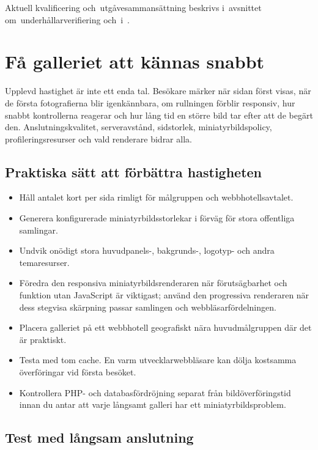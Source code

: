 \documentclass[11pt,a4paper]{article}
\newcommand{\filepath}[1]{\path{#1}}
\begin{document}
Aktuell kvalificering och~utgåvesammansättning beskrivs i~avsnittet
om~underhållarverifiering och~i~\filepath{RELEASE.md}.

\section{Få galleriet att kännas snabbt}
\label{sec:performance}

Upplevd hastighet är inte ett enda tal. Besökare märker när sidan först visas,
när de första fotografierna blir igenkännbara, om rullningen förblir responsiv,
hur snabbt kontrollerna reagerar och hur lång tid en större bild tar efter att
de begärt den. Anslutningskvalitet, serveravstånd, sidstorlek,
miniatyrbildspolicy, profileringsresurser och vald renderare bidrar alla.

\subsection{Praktiska sätt att förbättra hastigheten}

\begin{itemize}
  \item Håll antalet kort per sida rimligt för målgruppen och
  webbhotellsavtalet.
  \item Generera konfigurerade miniatyrbildsstorlekar i förväg för stora
  offentliga samlingar.
  \item Undvik onödigt stora huvudpanels-, bakgrunds-, logotyp- och andra
  temaresurser.
  \item Föredra den responsiva miniatyrbildsrenderaren när förutsägbarhet och
  funktion utan JavaScript är viktigast; använd den progressiva renderaren när
  dess stegvisa skärpning passar samlingen och webbläsarfördelningen.
  \item Placera galleriet på ett webbhotell geografiskt nära huvudmålgruppen där
  det är praktiskt.
  \item Testa med tom cache. En varm utvecklarwebbläsare kan dölja kostsamma
  överföringar vid första besöket.
  \item Kontrollera PHP- och databasfördröjning separat från bildöverföringstid
  innan du antar att varje långsamt galleri har ett miniatyrbildsproblem.
\end{itemize}

\subsection{Test med långsam anslutning}
\end{document}
